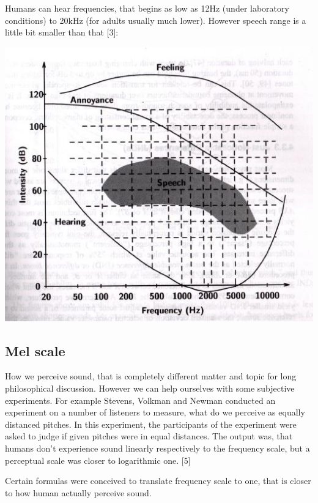 \documentclass[12pt,a4paper,english]{article}
\begin{document}
Humans can hear frequencies, that begins as low as 12Hz (under laboratory conditions) to 20kHz (for adults usually much lower). However speech range is a little bit smaller than that [3]: \newline

\begin{center}
    \includegraphics[scale=0.5]{speech_range.jpg}
\end {center}


\newpage
\subsection{Mel scale}

How we perceive sound, that is completely different matter and topic for long philosophical discussion. However we can help ourselves with some subjective experiments. For example Stevens, Volkman and Newman conducted an experiment on a number of listeners to measure, what do we perceive as equally distanced pitches. In this experiment, the participants of the experiment were asked to judge if given pitches were in equal distances. The output was, that humans don't experience sound linearly respectively to the frequency scale, but a perceptual scale was closer to logarithmic one. [5] \newline

Certain formulas were conceived to translate frequency scale to one, that is closer to how human actually perceive sound. \newline
\end{document}

